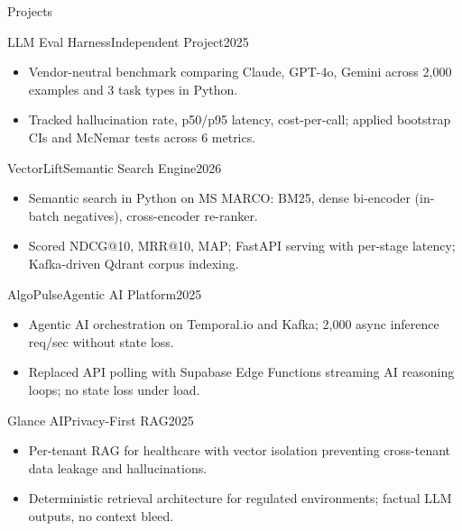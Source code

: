 \documentclass[]{mcdowellcv}
\begin{document}
\begin{cvsection}{Projects}
  \begin{cvsubsection}{LLM Eval Harness}{Independent Project}{2025}
    \begin{itemize}
      \item Vendor-neutral benchmark comparing Claude, GPT-4o, Gemini across 2,000 examples and 3 task types in Python.
      \item Tracked hallucination rate, p50/p95 latency, cost-per-call; applied bootstrap CIs and McNemar tests across 6 metrics.
    \end{itemize}
    \vspace{-1.5pt}
  \end{cvsubsection}

  \begin{cvsubsection}{VectorLift}{Semantic Search Engine}{2026}
    \begin{itemize}
      \item Semantic search in Python on MS MARCO: BM25, dense bi-encoder (in-batch negatives), cross-encoder re-ranker.
      \item Scored NDCG@10, MRR@10, MAP; FastAPI serving with per-stage latency; Kafka-driven Qdrant corpus indexing.
    \end{itemize}
    \vspace{-1.5pt}
  \end{cvsubsection}

  \begin{cvsubsection}{AlgoPulse}{Agentic AI Platform}{2025}
    \begin{itemize}
      \item Agentic AI orchestration on Temporal.io and Kafka; 2,000 async inference req/sec without state loss.
      \item Replaced API polling with Supabase Edge Functions streaming AI reasoning loops; no state loss under load.
    \end{itemize}
    \vspace{-1.5pt}
  \end{cvsubsection}

  \begin{cvsubsection}{Glance AI}{Privacy-First RAG}{2025}
    \begin{itemize}
      \item Per-tenant RAG for healthcare with vector isolation preventing cross-tenant data leakage and hallucinations.
      \item Deterministic retrieval architecture for regulated environments; factual LLM outputs, no context bleed.
    \end{itemize}
  \end{cvsubsection}
\end{cvsection}
\end{document}
